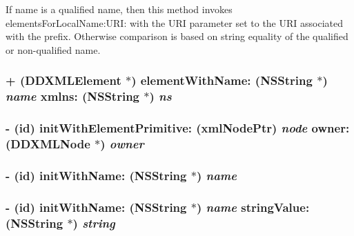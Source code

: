If name is a qualified name, then this method invokes elementsForLocalName:URI: with the URI parameter set to the URI associated with the prefix. Otherwise comparison is based on string equality of the qualified or non-\/qualified name. \hypertarget{class_d_d_x_m_l_element_ae3d8acf51242ab375427beda3db62e5f}{
\subsubsection[{elementWithName:xmlns:}]{\setlength{\rightskip}{0pt plus 5cm}+ ({\bf DDXMLElement} $\ast$) elementWithName: ({\bf NSString} $\ast$) {\em name}\/ xmlns: ({\bf NSString} $\ast$) {\em ns}}}
\label{class_d_d_x_m_l_element_ae3d8acf51242ab375427beda3db62e5f}
\hypertarget{class_d_d_x_m_l_element_a79d712d11aa8f735023fdb5b682765d8}{
\subsubsection[{initWithElementPrimitive:owner:}]{\setlength{\rightskip}{0pt plus 5cm}-\/ (id) initWithElementPrimitive: (xmlNodePtr) {\em node}\/ owner: ({\bf DDXMLNode} $\ast$) {\em owner}}}
\label{class_d_d_x_m_l_element_a79d712d11aa8f735023fdb5b682765d8}
\hypertarget{class_d_d_x_m_l_element_a7c33a6a67234196892281f15213fef04}{
\subsubsection[{initWithName:}]{\setlength{\rightskip}{0pt plus 5cm}-\/ (id) initWithName: ({\bf NSString} $\ast$) {\em name}}}
\label{class_d_d_x_m_l_element_a7c33a6a67234196892281f15213fef04}
\hypertarget{class_d_d_x_m_l_element_a41737cd45eb9d25991217b46e30a0da5}{
\subsubsection[{initWithName:stringValue:}]{\setlength{\rightskip}{0pt plus 5cm}-\/ (id) initWithName: ({\bf NSString} $\ast$) {\em name}\/ stringValue: ({\bf NSString} $\ast$) {\em string}}}
